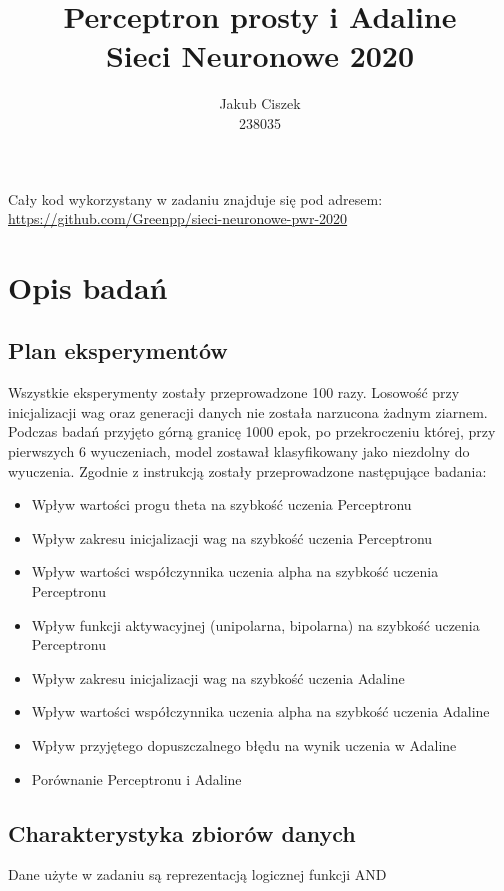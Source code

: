 \documentclass{article}
\title{  Perceptron prosty i Adaline\\Sieci Neuronowe 2020 }
\author{
  Jakub Ciszek \\
  238035\\
}
\begin{document}
\maketitle

\newpage
\tableofcontents
\newpage

Cały kod wykorzystany w zadaniu znajduje się pod adresem: \url{https://github.com/Greenpp/sieci-neuronowe-pwr-2020}

\section{Opis badań}
\subsection{Plan eksperymentów}

Wszystkie eksperymenty zostały przeprowadzone 100 razy. Losowość przy inicjalizacji wag oraz generacji danych nie została narzucona żadnym ziarnem. Podczas badań przyjęto górną granicę 1000 epok, po przekroczeniu której, przy pierwszych 6 wyuczeniach, model zostawał klasyfikowany jako niezdolny do wyuczenia. Zgodnie z instrukcją zostały przeprowadzone następujące badania:
\begin{itemize}
	\item Wpływ wartości progu theta na szybkość uczenia Perceptronu
	\item Wpływ zakresu inicjalizacji wag na szybkość uczenia Perceptronu
	\item Wpływ wartości współczynnika uczenia alpha na szybkość uczenia Perceptronu
	\item Wpływ funkcji aktywacyjnej (unipolarna, bipolarna) na szybkość uczenia Perceptronu
	\item Wpływ zakresu inicjalizacji wag na szybkość uczenia Adaline
	\item Wpływ wartości współczynnika uczenia alpha na szybkość uczenia Adaline
	\item Wpływ przyjętego dopuszczalnego błędu na wynik uczenia w Adaline
	\item Porównanie Perceptronu i Adaline
\end{itemize}

\subsection{Charakterystyka zbiorów danych}

Dane użyte w zadaniu są reprezentacją logicznej funkcji AND
\end{document}
